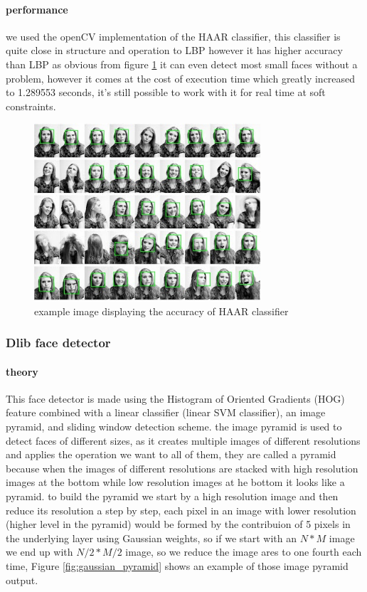 \paragraph{performance}
we used the openCV implementation of the HAAR classifier, this classifier is quite close in structure and operation to LBP however it has higher accuracy than LBP as obvious from figure \ref{fig:haar_example} it can even detect most small faces without a problem, however it comes at the cost of execution time which greatly increased to 1.289553 seconds, it's still possible to work with it for real time at soft constraints.
\begin{figure}
	\centering
	\includegraphics[width=0.75\textwidth]{images/haar_example.jpg}
	\caption{example image displaying the accuracy of HAAR classifier}
	\label{fig:haar_example}
\end{figure}


\subsubsection{Dlib face detector}
\paragraph{theory}
This face detector is made using the Histogram of Oriented Gradients (HOG) feature combined with a linear classifier (linear SVM classifier), an image pyramid, and sliding window detection scheme.
the image pyramid is used to detect faces of different sizes, as it creates multiple images of different resolutions and applies the operation we want to all of them, they are called a pyramid because when the images of different resolutions are stacked with high resolution images at the bottom while low resolution images at he bottom it looks like a pyramid.
to build the pyramid we start by a high resolution image and then reduce its resolution a step by step, each pixel in an image with lower resolution (higher level in the pyramid) would be formed by the contribuion of 5 pixels in the underlying layer using Gaussian weights, so if we start with an $N * M$ image we end up with $N/2 * M/2$ image, so we reduce the image ares to one fourth each time, Figure \ref{fig:gaussian_pyramid} shows an example of those image pyramid output.


